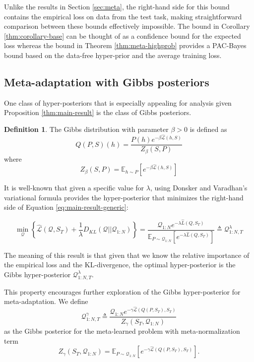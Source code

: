\documentclass{article}
\theoremstyle{definition}
\newtheorem{defn}{Definition}[section]
\newcommand{\Expect}[2]{\mathbb{E}_{#1}\left [#2 \right ]}
\begin{document}
Unlike the results in Section \ref{sec:meta}, the right-hand side for this bound contains the empirical loss on data from the test task, making straightforward comparison between these bounds effectively impossible. The bound in Corollary \ref{thm:corollary-base} can be thought of as a confidence bound for the expected loss whereas the bound in Theorem \ref{thm:meta-highprob} provides a PAC-Bayes bound based on the data-free hyper-prior and the average training loss.

\subsection{Meta-adaptation with Gibbs posteriors} \label{sec:adapt-gibbs}

One class of hyper-posteriors that is especially appealing for analysis given Proposition \ref{thm:main-result} is the class of Gibbs posteriors.

\begin{defn} \label{defn:Gibbs}
	The Gibbs distribution with parameter $\beta>0$ is defined as $$Q(P,S)(h)=\frac{P(h)e^{-\beta \hat{\mathcal{L}}(h,S)}}{Z_\beta(S,P)}$$ 
	where 
	$$Z_\beta(S,P)=\Expect{h\sim P}{e^{-\beta\hat{\mathcal{L}}(h,S)}}$$
\end{defn}

It is well-known that given a specific value for $\lambda$, using Donsker and Varadhan’s variational formula \citep{Donsker1975} provides the hyper-posterior that minimizes the right-hand side of Equation \ref{eq:main-result-generic}:

$$\min_{\mathcal{Q}} \left\{ \hat{\mathcal{L}}(\mathcal{Q}, S_T) + \frac{1}{\lambda}D_{KL}(\mathcal{Q}||\mathcal{Q}_{1:N}) \right\} = \frac{\mathcal{Q}_{1:N}e^{-\lambda\hat{L}(Q,S_T)}}{\Expect{P\sim \mathcal{Q}_{1:N}}{e^{-\lambda\hat{L}(Q,S_T)}}}\triangleq \mathcal{Q}^{\lambda}_{1:N,T}$$

The meaning of this result is that given that we know the relative importance of the empirical loss and the KL-divergence, the optimal hyper-posterior is the Gibbs hyper-posterior $\mathcal{Q}^{\lambda}_{1:N,T}$.

This property encourages further exploration of the Gibbs hyper-posterior for meta-adaptation. We define $$\mathcal{Q}^{\gamma}_{1:N,T}\triangleq \frac{\mathcal{Q}_{1:N}e^{-\gamma\hat{\mathcal{L}}(Q(P,S_T),S_T)}}{Z_\gamma(S_T, \mathcal{Q}_{1:N})}$$ as the Gibbs posterior for the meta-learned problem with meta-normalization term $$Z_\gamma(S_T, \mathcal{Q}_{1:N})=\Expect{P\sim \mathcal{Q}_{1:N}}{e^{-\gamma\hat{\mathcal{L}}(Q(P,S_T),S_T)}}.$$
\end{document}
